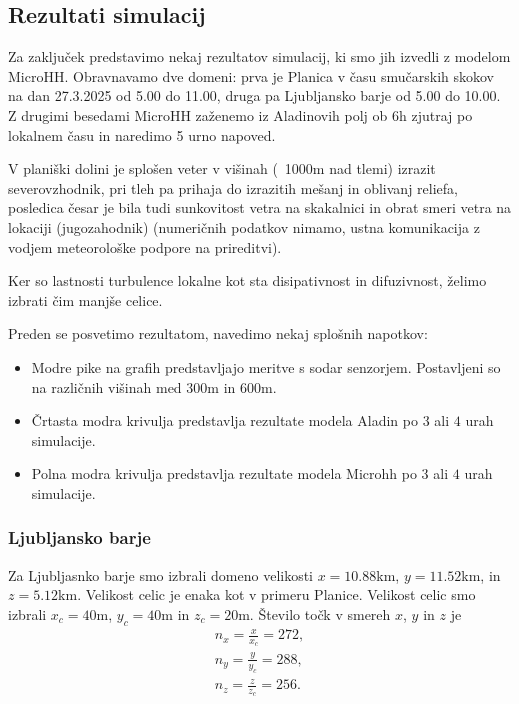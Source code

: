 \documentclass[mat2, tisk]{fmfdelo}
\begin{document}
\subsection{Rezultati simulacij}

Za zaključek predstavimo nekaj rezultatov simulacij, ki smo jih izvedli z modelom MicroHH.
Obravnavamo dve domeni: prva je Planica v času smučarskih skokov na dan 27.3.2025 od 5.00 do 11.00, druga 
pa Ljubljansko barje od 5.00 do 10.00. Z drugimi besedami 
MicroHH zaženemo iz Aladinovih polj ob 6h zjutraj po lokalnem času in naredimo 5 urno napoved.

V planiški dolini je splošen veter v višinah 
(~1000m nad tlemi) izrazit severovzhodnik, pri tleh
pa prihaja do izrazitih mešanj in oblivanj reliefa, 
posledica česar je bila tudi sunkovitost vetra na 
skakalnici  in obrat smeri vetra na lokaciji 
(jugozahodnik) (numeričnih podatkov nimamo, ustna 
komunikacija z vodjem meteorološke podpore na prireditvi).

Ker so lastnosti 
turbulence lokalne kot sta disipativnost in difuzivnost, želimo 
izbrati čim manjše celice.

Preden se posvetimo rezultatom, navedimo nekaj splošnih napotkov: 
\begin{itemize}
  \item Modre pike na grafih predstavljajo meritve s sodar senzorjem. 
  Postavljeni so na različnih višinah med $300$m in $600$m. 
  \item Črtasta modra krivulja predstavlja rezultate modela Aladin po $3$ ali $4$
  urah simulacije.
  \item Polna modra krivulja predstavlja rezultate modela Microhh po $3$ ali $4$
  urah simulacije.
\end{itemize}


\subsubsection{Ljubljansko barje}

Za Ljubljasnko barje smo izbrali domeno velikosti $x= 10.88$km, 
$y = 11.52$km, in $z = 5.12$km. Velikost celic je enaka kot v primeru Planice.
Velikost celic smo izbrali
$x_c=40$m, $y_c=40$m in $z_c=20$m. Število točk v smereh $x$, $y$ in $z$ je 
\begin{align*}
n_x = \frac{x}{x_c} = 272 , \\
n_y = \frac{y}{y_c} = 288, \\
n_z = \frac{z}{z_c} = 256.
\end{align*}
\end{document}

